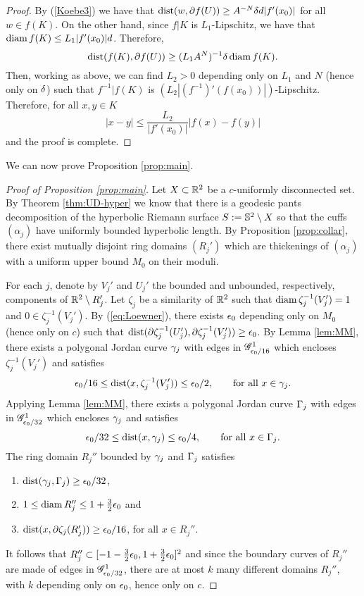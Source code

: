 \documentclass{amsart}
\DeclareMathOperator{\dist}{dist}
\begin{document}
\begin{proof}
By (\ref{Koebe3}) we have that $\dist(w,\partial f(U)) \geq A^{-N}\d d|f'(x_0)|$ for all $w\in f(K)$. On the other hand, since $f|K$ is $L_1$-Lipschitz, we have that $\diam{f(K)} \leq L_1|f'(x_0)| d$. Therefore, 
\[ \dist(f(K),\partial f(U)) \geq (L_1A^N)^{-1}\d\diam{f(K)}.\] 
Then, working as above, we can find $L_2>0$ depending only on $L_1$ and $N$ (hence only on $\d$) such that $f^{-1}|f(K)$ is $(L_2|(f^{-1})'(f(x_0))|)$-Lipschitz. Therefore, for all $x,y \in K$
\[ |x - y| \leq \frac{L_2}{|f'(x_0)|} |f(x)-f(y)| \]
and the proof is complete.
\end{proof}

We can now prove Proposition \ref{prop:main}.

\begin{proof}[{Proof of Proposition \ref{prop:main}}]
Let $X \subset \R^2$ be a $c$-uniformly disconnected set. By Theorem \ref{thm:UD-hyper} we know that there is a geodesic pants decomposition of the hyperbolic Riemann surface $S:= \S^2 \setminus X$ so that the cuffs $(\alpha_j)$ have uniformly bounded hyperbolic length. By Proposition \ref{prop:collar}, there exist mutually disjoint ring domains $(R_j')$ which are thickenings of $(\alpha_j)$ with a uniform upper bound $M_0$ on their moduli. 

For each $j$, denote by $V_j'$ and $U_j'$ the bounded and unbounded, respectively, components of $\R^2 \setminus R_j'$. Let $\zeta_j$ be a similarity of $\R^2$ such that $\diam{\zeta_j^{-1}(V_j')}=1$ and $0 \in \zeta_j^{-1}(V_j')$. By (\ref{eq:Loewner}), there exists $\e_0$ depending only on $M_0$ (hence only on $c$) such that $\dist(\partial\zeta_j^{-1}(U_j'),\partial\zeta_j^{-1}(V_j')) \geq \e_0$. By Lemma \ref{lem:MM}, there exists a polygonal Jordan curve $\g_j$ with edges in $\mathscr{G}_{\e_0/16}^1$ which encloses $\zeta_j^{-1}(V_j')$ and satisfies
\[ \e_0/16 \leq \dist(x,\zeta_j^{-1}(V_j')) \leq \e_0/2, \qquad\text{for all $x\in \g_j$}.\]
Applying Lemma \ref{lem:MM}, there exists a polygonal Jordan curve $\G_j$ with edges in $\mathscr{G}_{\e_0/32}^1$ which encloses $\g_j$ and satisfies
\[ \e_0/32 \leq \dist(x,\g_j) \leq \e_0/4, \qquad\text{for all $x\in \G_j$}.\]
The ring domain $R_j''$ bounded by $\g_j$ and $\G_j$ satisfies 
\begin{enumerate}
\item $\dist(\g_j,\G_j) \geq \e_0/32$,
\item $1\leq \diam{R_j''} \leq 1+ \frac32\e_0$ and 
\item $\dist(x, \partial\zeta_j(R_j')) \geq \e_0/16$, for all $x\in R_j''$.
\end{enumerate}
It follows that $R_j'' \subset [-1- \frac32\e_0,1+ \frac32\e_0]^2$ and since the boundary curves of $R_j''$ are made of edges in $\mathscr{G}_{\e_0/32}^1$, there are at most $k$ many different domains $R_j'' $, with $k$ depending only on $\e_0$, hence only on $c$. 


\end{proof}
\end{document}
